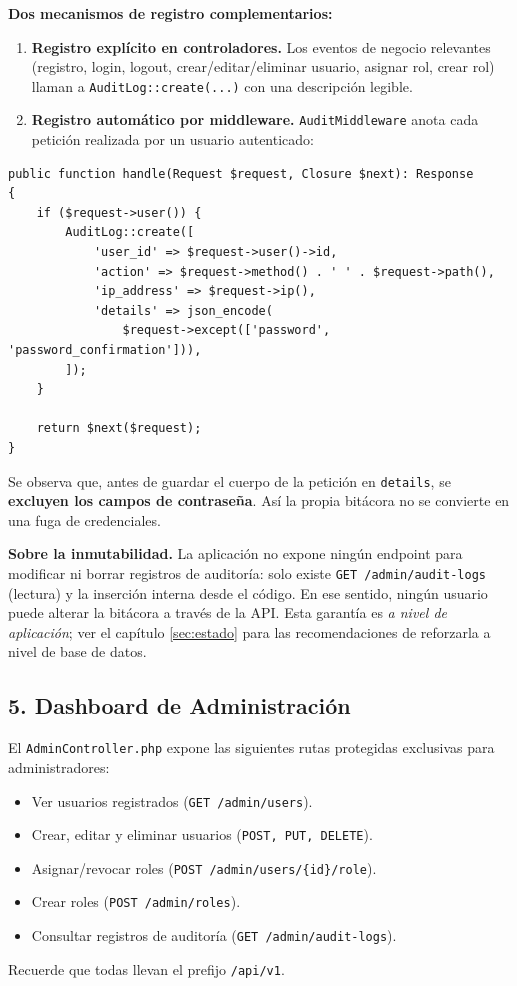 \textbf{Dos mecanismos de registro complementarios:}
\begin{enumerate}
    \item \textbf{Registro explícito en controladores.} Los eventos de negocio relevantes (registro, login, logout, crear/editar/eliminar usuario, asignar rol, crear rol) llaman a \texttt{AuditLog::create(...)} con una descripción legible.
    \item \textbf{Registro automático por middleware.} \texttt{AuditMiddleware} anota cada petición realizada por un usuario autenticado:
\end{enumerate}
\begin{lstlisting}[caption={app/Http/Middleware/AuditMiddleware.php}]
public function handle(Request $request, Closure $next): Response
{
    if ($request->user()) {
        AuditLog::create([
            'user_id' => $request->user()->id,
            'action' => $request->method() . ' ' . $request->path(),
            'ip_address' => $request->ip(),
            'details' => json_encode(
                $request->except(['password', 'password_confirmation'])),
        ]);
    }

    return $next($request);
}
\end{lstlisting}
Se observa que, antes de guardar el cuerpo de la petición en \texttt{details}, se \textbf{excluyen los campos de contraseña}. Así la propia bitácora no se convierte en una fuga de credenciales.

\textbf{Sobre la inmutabilidad.} La aplicación no expone ningún endpoint para modificar ni borrar registros de auditoría: solo existe \texttt{GET /admin/audit-logs} (lectura) y la inserción interna desde el código. En ese sentido, ningún usuario puede alterar la bitácora a través de la API. Esta garantía es \emph{a nivel de aplicación}; ver el capítulo \ref{sec:estado} para las recomendaciones de reforzarla a nivel de base de datos.

\subsection{5. Dashboard de Administración}
El \texttt{AdminController.php} expone las siguientes rutas protegidas exclusivas para administradores:
\begin{itemize}
    \item Ver usuarios registrados (\texttt{GET /admin/users}).
    \item Crear, editar y eliminar usuarios (\texttt{POST, PUT, DELETE}).
    \item Asignar/revocar roles (\texttt{POST /admin/users/\{id\}/role}).
    \item Crear roles (\texttt{POST /admin/roles}).
    \item Consultar registros de auditoría (\texttt{GET /admin/audit-logs}).
\end{itemize}
Recuerde que todas llevan el prefijo \texttt{/api/v1}.

